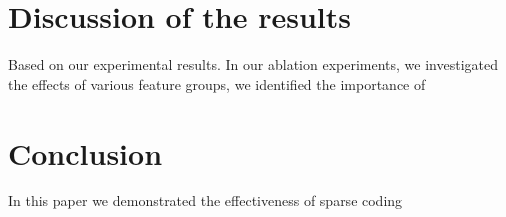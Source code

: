 \documentclass[11pt,a4paper]{article}
\begin{document}




\section{Discussion of the results}

Based on our experimental results. In our ablation experiments, we investigated 
the effects of various feature groups, we identified the importance of 

\section{Conclusion}

In this paper we demonstrated the effectiveness of sparse coding 




\end{document}

